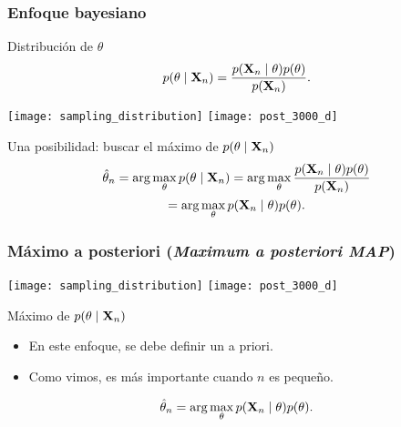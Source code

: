 \documentclass[table]{beamer}
\begin{document}
\begin{frame}
    \frametitle{Enfoque bayesiano}
    \begin{block}{Distribución de $\theta$}
        \begin{equation*}
            \pdf{\theta \mid \Xvec_{n}} = \frac{\pdf{\Xvec_{n} \mid \theta} \pdf{\theta}}{\pdf{\Xvec_{n}}} .
        \end{equation*}
    \end{block}
    \begin{center}
        \texttt{[image: sampling\_distribution]}
        \texttt{[image: post\_3000\_d]}
    \end{center}
    \begin{block}{Una posibilidad: buscar el máximo de $\pdf{\theta \mid \Xvec_{n}}$}
        \begin{multline*}
            \hat{\theta}_{n} = \arg \max_{\theta} \pdf{\theta \mid \Xvec_{n}} = \arg \max_{\theta} \frac{\pdf{\Xvec_{n} \mid \theta} \pdf{\theta}}{\pdf{\Xvec_{n}}}
            \\
            = \arg \max_{\theta} \pdf{\Xvec_{n} \mid \theta} \pdf{\theta} .
        \end{multline*}
    \end{block}
\end{frame}

\begin{frame}
    \frametitle{Máximo a posteriori (\emph{Maximum a posteriori MAP})}
    \begin{center}
        \texttt{[image: sampling\_distribution]}
        \texttt{[image: post\_3000\_d]}
    \end{center}
    \begin{block}{Máximo de $\pdf{\theta \mid \Xvec_{n}}$}
        \begin{itemize}
            \item En este enfoque, se debe definir un a priori.
            \item Como vimos, es más importante cuando $n$ es pequeño.
        \end{itemize}
        \begin{equation*}
            \hat{\theta}_{n}
            = \arg \max_{\theta} \pdf{\Xvec_{n} \mid \theta} \pdf{\theta} .
        \end{equation*}
    \end{block}
\end{frame}
\end{document}
